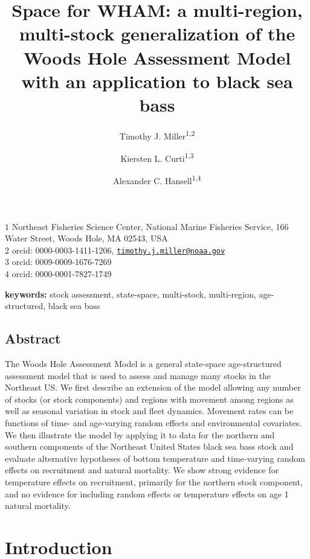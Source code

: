 \documentclass[
]{article}
\title{Space for WHAM: a multi-region, multi-stock generalization of the Woods Hole Assessment Model with an application to black sea bass}
\author{Timothy J. Miller\textsuperscript{1,2} \and Kiersten L. Curti\textsuperscript{1,3} \and Alexander C. Hansell\textsuperscript{1,4}}
\date{}
\begin{document}
\maketitle

\(1\) Northeast Fisheries Science Center, National Marine Fisheries Service, 166 Water Street, Woods Hole, MA 02543, USA\\
\(2\) orcid: 0000-0003-1411-1206, \href{mailto:timothy.j.miller@noaa.gov}{\nolinkurl{timothy.j.miller@noaa.gov}}\\
\(3\) orcid: 0009-0009-1676-7269\\
\(4\) orcid: 0000-0001-7827-1749\\

\pagebreak

\textbf{keywords:} stock assessment, state-space, multi-stock, multi-region, age-structured, black sea bass

\hypertarget{abstract}{%
\subsection*{Abstract}\label{abstract}}

The Woods Hole Assessment Model is a general state-space age-structured assessment model that is used to assess and manage many stocks in the Northeast US. We first describe an extension of the model allowing any number of stocks (or stock components) and regions with movement among regions as well as seasonal variation in stock and fleet dynamics. Movement rates can be functions of time- and age-varying random effects and environmental covariates. We then illustrate the model by applying it to data for the northern and southern components of the Northeast United States black sea bass stock and evaluate alternative hypotheses of bottom temperature and time-varying random effects on recruitment and natural mortality. We show strong evidence for temperature effects on recruitment, primarily for the northern stock component, and no evidence for including random effects or temperature effects on age 1 natural mortality.

\pagebreak

\hypertarget{introduction}{%
\section*{Introduction}\label{introduction}}
\end{document}
